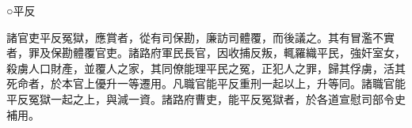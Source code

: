 \begin{pinyinscope}
 ○平反



 諸官吏平反冤獄，應賞者，從有司保勘，廉訪司體覆，而後議之。其有冒濫不實者，罪及保勘體覆官吏。諸路府軍民長官，因收捕反叛，輒羅織平民，強奸室女，殺虜人口財產，並覆人之家，其同僚能理平民之冤，正犯人之罪，歸其俘虜，活其死命者，於本官上優升一等遷用。凡職官能平反重刑一起以上，升等同。諸職官能平反冤獄一起之上，與減一資。諸路府曹吏，能平反冤獄者，於各道宣慰司部令史補用。



\end{pinyinscope}